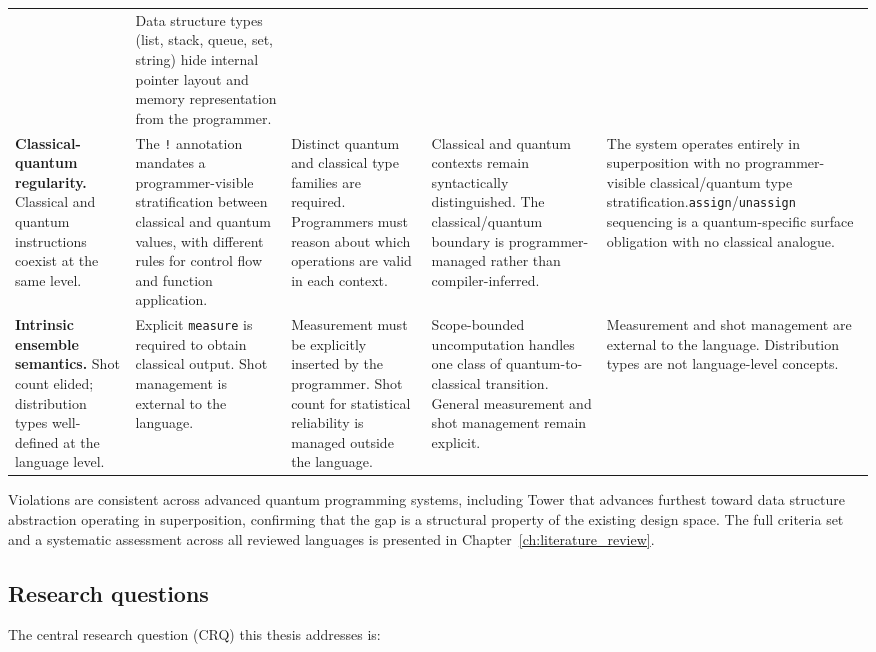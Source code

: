 \begin{xltabular}{\textwidth}{p{2.8cm}XXXX}
    & Data structure types (list, stack, queue, set, string) hide internal pointer layout and memory representation from the programmer. \\ \addlinespace
    \textbf{Classical-quantum regularity.}
    Classical and quantum instructions coexist at the same level.
    & The \texttt{!} annotation mandates a programmer-visible stratification between classical and quantum values, with different rules for control flow and function application.
    & Distinct quantum and classical type families are required. Programmers must reason about which operations are valid in each context.
    & Classical and quantum contexts remain syntactically distinguished. The classical/quantum boundary is programmer-managed rather than compiler-inferred.
    & The system operates entirely in superposition with no programmer-visible classical/quantum type stratification.\texttt{assign}/\texttt{unassign} sequencing is a quantum-specific surface obligation with no classical analogue.  \\ \addlinespace
    \textbf{Intrinsic ensemble semantics.}
    Shot count elided; distribution types well-defined at the language level.
    & Explicit \texttt{measure} is required to obtain classical output. Shot management is external to the language.
    & Measurement must be explicitly inserted by the programmer. Shot count for statistical reliability is managed outside the language.
    & Scope-bounded uncomputation handles one class of quantum-to-classical transition. General measurement and shot management remain explicit.
    & Measurement and shot management are external to the language. Distribution types are not language-level concepts. \\
    \bottomrule
\end{xltabular}

Violations are consistent across advanced quantum programming systems, including Tower that advances furthest toward data structure abstraction operating in superposition, confirming that the gap is a structural property of the existing design space.
The full criteria set and a systematic assessment across all reviewed languages is presented in Chapter~\ref{ch:literature_review}.

\subsection{Research questions}\label{subsec:introduction:research_questions:questions}
The central research question (CRQ) this thesis addresses is:

